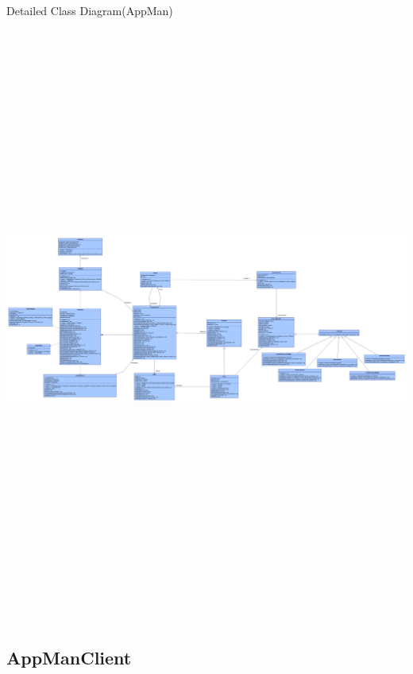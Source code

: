 \documentclass[a4paper,12pt,final]{article}
\begin{document}
\newpage
\begin{center}
Detailed Class Diagram(AppMan)
\includegraphics[angle = 90, height=20cm]{ClassDiagramAppMan.jpg} 
\end{center}

\subsection{AppManClient}
\end{document}
